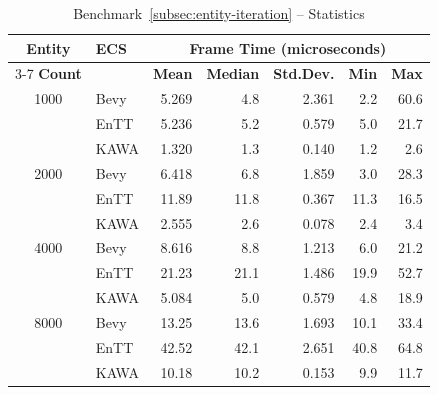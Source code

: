 \documentclass[conference]{IEEEtran}
\begin{document}
    \begin{table}[htbp]
        \caption{Benchmark~\ref{subsec:entity-iteration} – Statistics}
        \begin{center}
            \begin{tabular}{|c|l|r|r|r|r|r|}
                \hline
                \textbf{Entity} & \textbf{ECS} & \multicolumn{5}{|c|}{\textbf{Frame Time (microseconds)}} \\
                \cline{3-7}
                \textbf{Count} &  & \textbf{Mean} & \textbf{Median} & \textbf{Std.Dev.} & \textbf{Min} & \textbf{Max} \\
                \hline
                1000  & Bevy           & 5.269         & 4.8             & 2.361             & 2.2          & 60.6         \\
                & EnTT               & 5.236         & 5.2             & 0.579             & 5.0          & 21.7         \\
                & KAWA             & 1.320         & 1.3             & 0.140             & 1.2          & 2.6          \\
                \hline
                2000  & Bevy          & 6.418         & 6.8             & 1.859             & 3.0          & 28.3         \\
                & EnTT               & 11.89         & 11.8            & 0.367             & 11.3         & 16.5         \\
                & KAWA             & 2.555         & 2.6             & 0.078             & 2.4          & 3.4          \\
                \hline
                4000  & Bevy           & 8.616         & 8.8             & 1.213             & 6.0          & 21.2         \\
                & EnTT               & 21.23         & 21.1            & 1.486             & 19.9         & 52.7         \\
                & KAWA             & 5.084         & 5.0             & 0.579             & 4.8          & 18.9         \\
                \hline
                8000  & Bevy           & 13.25         & 13.6            & 1.693             & 10.1         & 33.4         \\
                & EnTT               & 42.52         & 42.1            & 2.651             & 40.8         & 64.8         \\
                & KAWA             & 10.18         & 10.2            & 0.153             & 9.9          & 11.7         \\

\end{tabular}
\end{center}
\end{table}
\end{document}
